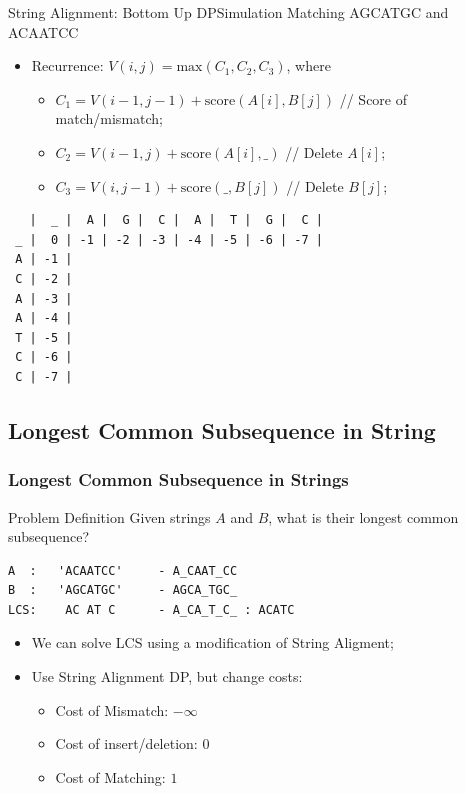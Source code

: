 \begin{frame}[fragile]{String Alignment: Bottom Up DP}{Simulation Matching AGCATGC and ACAATCC}

\begin{itemize}
  \item Recurrence: $V(i,j) = \text{max}(C_1, C_2, C_3)$, where
  \begin{itemize}
    \item $C_1 = V(i-1, j-1) + \text{score}(A[i],B[j])$ // Score of match/mismatch;
    \item $C_2 = V(i-1,j) + \text{score}(A[i],\_)$ \hspace{1cm}// Delete $A[i]$;
    \item $C_3 = V(i,j-1) + \text{score}(\_,B[j])$ \hspace{1cm}// Delete $B[j]$;
  \end{itemize}
\end{itemize}

\begin{verbatim}
   |  _ |  A |  G |  C |  A |  T |  G |  C |
 _ |  0 | -1 | -2 | -3 | -4 | -5 | -6 | -7 |
 A | -1 |
 C | -2 |
 A | -3 |
 A | -4 |
 T | -5 |
 C | -6 |
 C | -7 |
\end{verbatim}

\end{frame}


\subsection{Longest Common Subsequence in String}

\begin{frame}[fragile]
  \frametitle{Longest Common Subsequence in Strings}
    \begin{block}{Problem Definition}
      Given strings $A$ and $B$, what is their longest common subsequence?\medskip

\begin{verbatim}
A  :   'ACAATCC'     - A_CAAT_CC
B  :   'AGCATGC'     - AGCA_TGC_
LCS:    AC AT C      - A_CA_T_C_ : ACATC
\end{verbatim}
    \end{block}\bigskip

  \begin{itemize}
    \item We can solve LCS using a modification of String Aligment;
    \item Use String Alignment DP, but change costs:
    \begin{itemize}
      \item Cost of Mismatch: $-\infty$
      \item Cost of insert/deletion: $0$
      \item Cost of Matching: $1$
    \end{itemize}
  \end{itemize}
\end{frame}

